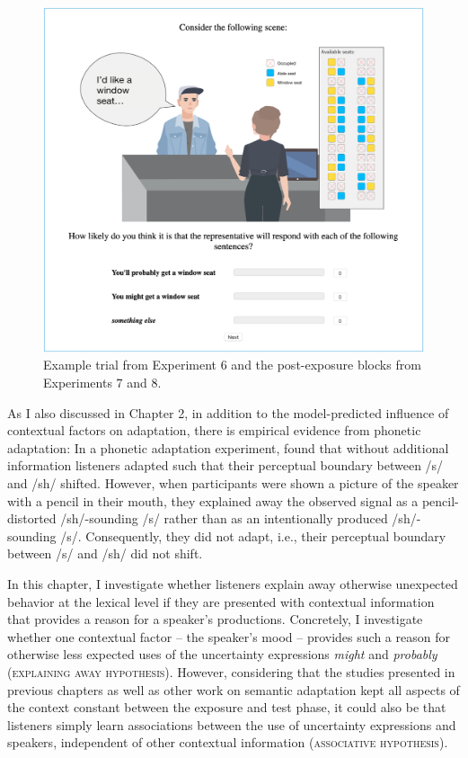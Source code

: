 \begin{figure}
    \centering
    \includegraphics[width=0.75\columnwidth, trim={0 1cm 0 0cm}]{./plots/example-trial.png}
    \caption{Example trial from Experiment 6 and the post-exposure blocks from Experiments 7 and 8.}
    \label{fig:example-trial-ea}
\end{figure}

As I also discussed in Chapter 2, in addition to the model-predicted influence of contextual factors on adaptation, there is empirical evidence from phonetic adaptation: In a phonetic adaptation experiment, \textcite{Kraljic2008} found that without additional information listeners adapted such that their perceptual boundary between /s/ and /sh/ shifted. However, when participants were shown a picture of the speaker with a pencil in their mouth, they explained away the observed signal as a pencil-distorted /sh/-sounding /s/ rather than as an intentionally produced /sh/-sounding /s/. Consequently, they did not adapt, i.e., their perceptual boundary between /s/ and /sh/ did not shift.

In this chapter, I investigate whether listeners explain away otherwise unexpected behavior at the lexical level if they are presented with contextual information that provides a reason for a speaker's productions. Concretely, I investigate whether one contextual factor  -- the speaker's mood -- provides such a reason for otherwise less expected uses of the uncertainty expressions \textit{might} and \textit{probably}  (\textsc{explaining away hypothesis}). However, considering that the studies presented in previous chapters as well as other work on semantic adaptation \cite{Yildirim2016} kept all aspects of the context constant between the exposure and test phase, it could also be that listeners simply learn associations between the use of uncertainty expressions and speakers, independent of other contextual information (\textsc{associative hypothesis}).

